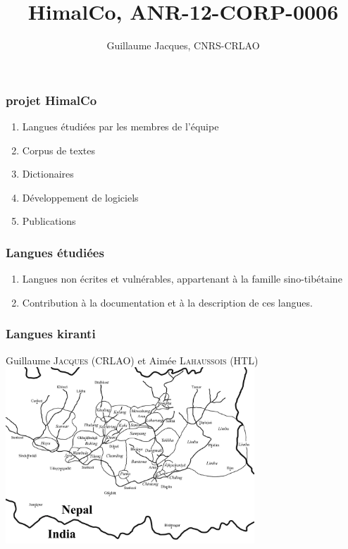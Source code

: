 \documentclass[xcolor=table]{beamer}
\begin{document}
 
\begin{frame} 

\title{HimalCo, ANR-12-CORP-0006} 

 \author{Guillaume Jacques, CNRS-CRLAO}
\maketitle
 \end{frame} 

\begin{frame} 
 \frametitle{projet HimalCo}
\begin{enumerate}[<+->]
\item Langues étudiées par les membres de l'équipe
\item Corpus de textes
\item Dictionaires
\item Développement de logiciels
\item Publications
\end{enumerate}
 
 \end{frame} 
 
 \begin{frame} 
 \frametitle{Langues étudiées}
 \begin{enumerate}
\item Langues non écrites et vulnérables, appartenant à la famille sino-tibétaine
\item Contribution à la documentation et à la description de ces langues.
\end{enumerate}
  
  
  \end{frame}  
 
 \begin{frame} 
 \frametitle{Langues kiranti}
 
 Guillaume \textsc{Jacques} (CRLAO) et Aimée \textsc{Lahaussois} (HTL)
  \includegraphics[width=0.7\textwidth]{Kirant.jpeg} \centering
  
  
  \end{frame} 
\end{document}
